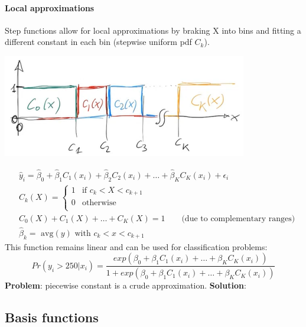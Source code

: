 \documentclass[../document.tex]{subfiles}
\begin{document}
	\paragraph{Local approximations}
	Step functions allow for local approximations by braking X into bins and fitting a different constant in each bin (stepwise uniform pdf $C_k$).
	\begin{center}
		\includegraphics[width=.5\textwidth]{pictures/stepwise_function}
	\end{center}
	\begin{equation}
	\begin{split}
		&\hat{y}_{i}=\hat{\beta}_{0}+\hat{\beta}_{1}C_{1}(x_{i})+\hat{\beta}_{2}C_{2}(x_{i})+\dots+\hat{\beta}_{K}C_{K}(x_{i})+\epsilon_{i}\\
		&C_k(X) = \begin{cases}
			1 & \text{if } c_{k}<X < c_{k+1}\\
			0 & \text{otherwise} \\
		\end{cases} \\
		&C_{0}(X)+C_{1}(X)+\dots+C_{K}(X)=1 \qquad \text{(due to complementary ranges)}\\
		&\hat{\beta}_{k} = \text{ avg} (y) \text{ with } {c_{k}}<x<{c_{k+1}}
	\end{split}
	\end{equation}
	This function remains linear and can be used for classification problems:
	\begin{equation}
		Pr(y_{i}>250|x_{i})=\frac{exp(\beta_{0}+\beta_{1}C_{1}(x_{i})+\dots+\beta_{K}C_{K}(x_{i}))}{1+exp(\beta_{0}+\beta_{1}C_{1}(x_{i})+\dots+\beta_{K}C_{K}(x_{i}))}
	\end{equation}
	\textbf{Problem}: piecewise constant is a crude approximation.
	\textbf{Solution}:

	\subsection{Basis functions}
\end{document}

